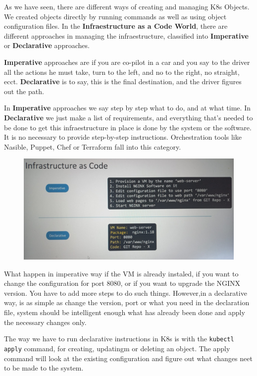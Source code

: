 \documentclass{article}
\begin{document}
As we have seen, there are different ways of creating and managing K8s Objects. We created objects directly by running commands as well as using object configuration files. In the \textbf{Infraestructure as a Code World}, there are different approaches in managing the infraestructure, classified into \textbf{Imperative} or \textbf{Declarative} approaches.

\textbf{Imperative} approaches are if you are co-pilot in a car and you say to the driver all the actions he must take, turn to the left, and no to the right, no straight, ecct. \textbf{Declarative} is to say, this is the final destination, and the driver figures out the path.

In \textbf{Imperative} approaches we say step by step what to do, and at what time. In \textbf{Declarative} we just make a list of requirements, and everything that's needed to be done to get this infraestructure in place is done by the system or the software. It is no necessary to provide step-by-step instructions. Orchestration tools like Nasible, Puppet, Chef or Terraform fall into this category.

\begin{figure}[H]
    \centering
    \includegraphics[width=\textwidth]{pictures/impdec.jpeg}
\end{figure}

What happen in imperative way if the VM is already instaled, if you want to change the configuration for port 8080, or if you want to upgrade the NGINX version. You have to add more steps to do such things. However,in a declarative way, is as simple as change the version, port or what you need in the declaration file, system should be intelligent enough what has already been done and apply the necessary changes only.

The way we have to run declarative instructions in K8s is with the \verb|kubectl apply| command, for creating, updatingm or deleting an object. The apply command will look at the existing configuration and figure out what changes neet to be made to the system.
\end{document}
